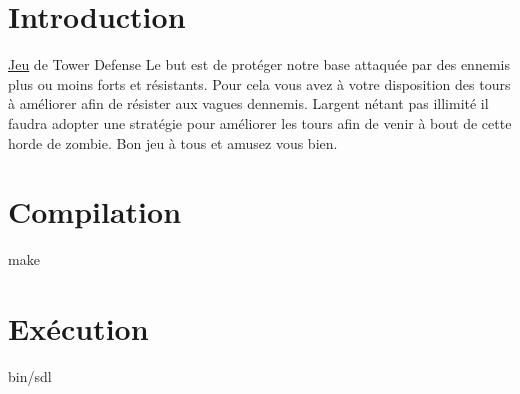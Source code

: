 \hypertarget{index_Introduction}{}\section{Introduction}\label{index_Introduction}
\hyperlink{classJeu}{Jeu} de Tower Defense Le but est de protéger notre base attaquée par des ennemis plus ou moins forts et résistants. Pour cela vous avez à votre disposition des tours à améliorer afin de résister aux vagues d\textquotesingle{}ennemis. L\textquotesingle{}argent n\textquotesingle{}étant pas illimité il faudra adopter une stratégie pour améliorer les tours afin de venir à bout de cette horde de zombie. Bon jeu à tous et amusez vous bien. \hypertarget{index_Compilation}{}\section{Compilation}\label{index_Compilation}
make \hypertarget{index_Exécution}{}\section{Exécution}\label{index_Exécution}
bin/sdl 